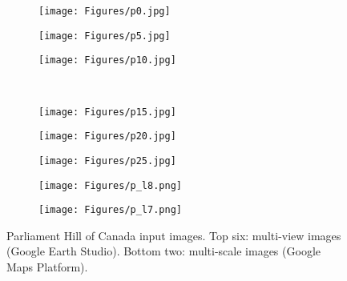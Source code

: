 \begin{figure}[h]
    \centering
    \begin{subfigure}{0.15\textwidth}
        \texttt{[image: Figures/p0.jpg]} 
    \end{subfigure}
    \begin{subfigure}{0.15\textwidth}
        \texttt{[image: Figures/p5.jpg]}
    \end{subfigure}
    \begin{subfigure}{0.15\textwidth}
        \texttt{[image: Figures/p10.jpg]}
    \end{subfigure}
    \\
    \begin{subfigure}{0.15\textwidth}
        \texttt{[image: Figures/p15.jpg]}
    \end{subfigure}
    \begin{subfigure}{0.15\textwidth}
        \texttt{[image: Figures/p20.jpg]}
    \end{subfigure}
    \begin{subfigure}{0.15\textwidth}
        \texttt{[image: Figures/p25.jpg]}
    \end{subfigure}
    \begin{subfigure}{0.15\textwidth}
    \vspace{0.2cm}
        \texttt{[image: Figures/p\_l8.png]}
    \end{subfigure}
    \hspace{0.015\textwidth}
    \begin{subfigure}{0.15\textwidth}
        \texttt{[image: Figures/p\_l7.png]}
    \end{subfigure}
    \caption{Parliament Hill of Canada input images. Top six: multi-view images (Google Earth Studio). Bottom two: multi-scale images (Google Maps Platform).}
    \label{fig:parliament_hill}
\end{figure}